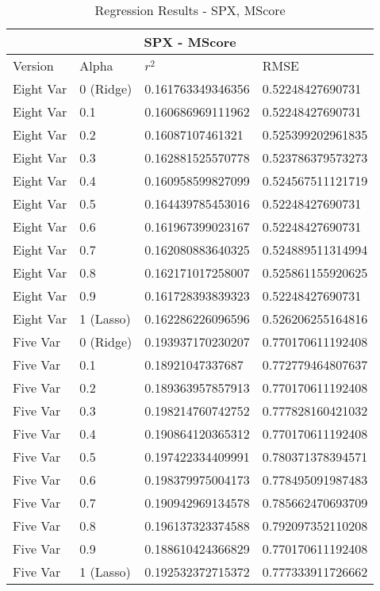 \begin{table}[h!]
\centering
\begin{tabular}{ |p{2.5cm}||p{2.5cm}||p{4cm}|p{4cm}| }
 \hline
 \multicolumn{4}{|c|}{SPX - MScore} \\
 \hline
 Version & Alpha & $r^2$ & RMSE \\
 \hline
 Eight Var & 0 (Ridge) & 0.161763349346356 & 0.52248427690731\\
 Eight Var & 0.1 & 0.160686969111962 & 0.52248427690731\\
 Eight Var & 0.2 & 0.16087107461321 & 0.525399202961835\\
 Eight Var & 0.3 & 0.162881525570778 & 0.523786379573273\\
 Eight Var & 0.4 & 0.160958599827099 & 0.524567511121719\\
 Eight Var & 0.5 & 0.164439785453016 & 0.52248427690731\\
 Eight Var & 0.6 & 0.161967399023167 & 0.52248427690731\\
 Eight Var & 0.7 & 0.162080883640325 & 0.524889511314994\\
 Eight Var & 0.8 & 0.162171017258007 & 0.525861155920625\\
 Eight Var & 0.9 & 0.161728393839323 & 0.52248427690731\\
 Eight Var & 1 (Lasso) & 0.162286226096596 & 0.526206255164816\\
 \hline
Five Var & 0 (Ridge) & 0.193937170230207 & 0.770170611192408\\
Five Var & 0.1 & 0.18921047337687 & 0.772779464807637\\
Five Var & 0.2 & 0.189363957857913 & 0.770170611192408\\
Five Var & 0.3 & 0.198214760742752 & 0.777828160421032\\
Five Var & 0.4 & 0.190864120365312 & 0.770170611192408\\
Five Var & 0.5 & 0.197422334409991 & 0.780371378394571\\
Five Var & 0.6 & 0.198379975004173 & 0.778495091987483\\
Five Var & 0.7 & 0.190942969134578 & 0.785662470693709\\
Five Var & 0.8 & 0.196137323374588 & 0.792097352110208\\
Five Var & 0.9 & 0.188610424366829 & 0.770170611192408\\
Five Var & 1 (Lasso) & 0.192532372715372 & 0.777333911726662\\
 \hline
\end{tabular}
\caption{Regression Results  - SPX, MScore}
\end{table}
\clearpage

